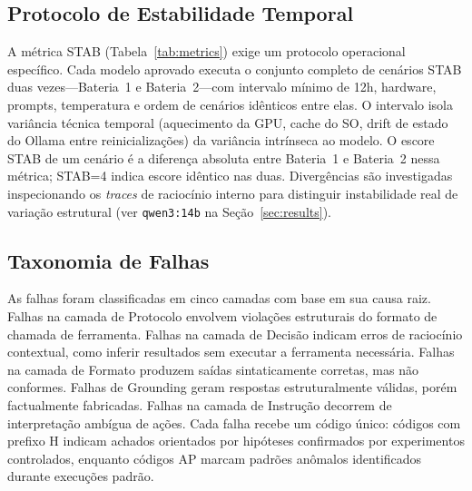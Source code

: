 \documentclass{kdmile}
\begin{document}
\subsection{Protocolo de Estabilidade Temporal}
\label{sec:stab-protocol}

A métrica STAB (Tabela~\ref{tab:metrics}) exige um protocolo operacional
específico. Cada modelo aprovado executa o conjunto completo de cenários STAB
duas vezes—\allowbreak Bateria~1 e Bateria~2—\allowbreak com intervalo mínimo de 12h, hardware,
prompts, temperatura e ordem de cenários idênticos entre elas. O intervalo
isola variância técnica temporal (aquecimento da GPU, cache do SO, drift de
estado do Ollama entre reinicializações) da variância intrínseca ao modelo. O
escore STAB de um cenário é a diferença absoluta entre Bateria~1 e Bateria~2
nessa métrica; STAB=4 indica escore idêntico nas duas. Divergências são
investigadas inspecionando os \emph{traces} de raciocínio interno para
distinguir instabilidade real de variação estrutural (ver \texttt{qwen3:14b}
na Seção~\ref{sec:results}).

\subsection{Taxonomia de Falhas}

As falhas foram classificadas em cinco camadas com base em sua causa raiz.
Falhas na camada de Protocolo envolvem violações estruturais do formato de
chamada de ferramenta. Falhas na camada de Decisão indicam erros de raciocínio
contextual, como inferir resultados sem executar a ferramenta necessária. Falhas
na camada de Formato produzem saídas sintaticamente corretas, mas não conformes.
Falhas de Grounding geram respostas estruturalmente válidas, porém factualmente
fabricadas. Falhas na camada de Instrução decorrem de interpretação ambígua de
ações. Cada falha recebe um código único: códigos com prefixo H indicam achados
orientados por hipóteses confirmados por experimentos controlados, enquanto
códigos AP marcam padrões anômalos identificados durante execuções padrão.
\end{document}
